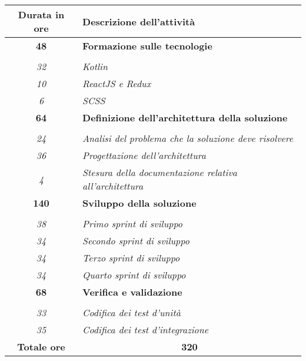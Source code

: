 

\begin{tabularx}{\textwidth}{|c|X|}
	\hline
	\textbf{Durata in ore} & \textbf{Descrizione dell'attività} \\ \hline
	
	\textbf{48} & \textbf{Formazione sulle tecnologie} \\ \hdashline 
	\multirow{3}{0cm}\\ 
	\textit{32} & 
	\textit{Kotlin} \\
	\textit{10} & 
	\textit{ReactJS e Redux} \\
	\textit{6} & 
	\textit{SCSS} \\
	\hline
  
    \textbf{64} & \textbf{Definizione dell'architettura della soluzione} \\ \hdashline 
    \multirow{3}{0cm}\\ 
    \textit{24} & 
    \textit{Analisi del problema che la soluzione deve risolvere} \\
    \textit{36} & 
    \textit{Progettazione dell'architettura} \\
    \textit{4} & 
    \textit{Stesura della documentazione relativa all'architettura} \\
    \hline
    
    \textbf{140} & \textbf{Sviluppo della soluzione} \\ \hdashline 
    \multirow{3}{0cm}\\ 
    \textit{38} & 
    \textit{Primo sprint di sviluppo} \\
    \textit{34} & 
    \textit{Secondo sprint di sviluppo} \\
    \textit{34} & 
    \textit{Terzo sprint di sviluppo} \\
    \textit{34} & 
    \textit{Quarto sprint di sviluppo} \\
    \hline
    
    \textbf{68} & \textbf{Verifica e validazione}  \\ \hdashline 
    \multirow{4}{0cm}\\ 
    \textit{33} & 
    \textit{Codifica dei test d'unità} \\
    \textit{35} & 
    \textit{Codifica dei test d'integrazione} \\
    \hline
	
	\textbf{Totale ore} & \multicolumn{1}{|c|}{\textbf{320}} \\\hline
	
	
\end{tabularx}